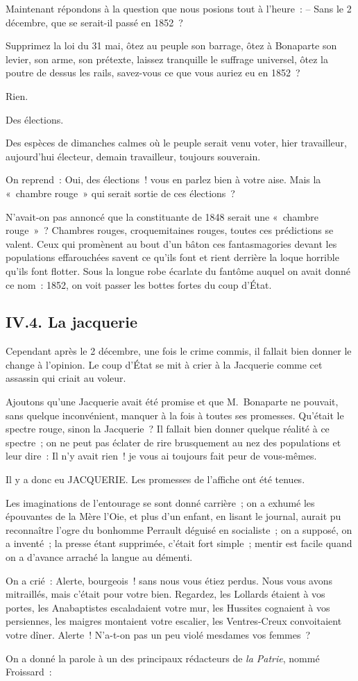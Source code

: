 \documentclass[french,twoside]{book} %
\begin{document}
Maintenant répondons à la question que nous posions tout à l’heure : – Sans le 2 décembre, que se serait-il passé en 1852 ?\par
Supprimez la loi du 31 mai, ôtez au peuple son barrage, ôtez à Bonaparte son levier, son arme, son prétexte, laissez tranquille le suffrage universel, ôtez la poutre de dessus les rails, savez-vous ce que vous auriez eu en 1852 ?\par
Rien.\par
Des élections.\par
Des espèces de dimanches calmes où le peuple serait venu voter, hier travailleur, aujourd’hui électeur, demain travailleur, toujours souverain.\par
On reprend : Oui, des élections ! vous en parlez bien à votre aise. Mais la « chambre rouge » qui serait sortie de ces élections ?\par
N’avait-on pas annoncé que la constituante de 1848 serait une « chambre rouge » ? Chambres rouges, croquemitaines rouges, toutes ces prédictions se valent. Ceux qui promènent au bout d’un bâton ces fantasmagories devant les populations effarouchées savent ce qu’ils font et rient derrière la loque horrible qu’ils font flotter. Sous la longue robe écarlate du fantôme auquel on avait donné ce nom : 1852, on voit passer les bottes fortes du coup d’État.
\subsection[{IV.4. La jacquerie}]{IV.4. La jacquerie}
\noindent Cependant après le 2 décembre, une fois le crime commis, il fallait bien donner le change à l’opinion. Le coup d’État se mit à crier à la Jacquerie comme cet assassin qui criait au voleur.\par
Ajoutons qu’une Jacquerie avait été promise et que M. Bonaparte ne pouvait, sans quelque inconvénient, manquer à la fois à toutes ses promesses. Qu’était le spectre rouge, sinon la Jacquerie ? Il fallait bien donner quelque réalité à ce spectre ; on ne peut pas éclater de rire brusquement au nez des populations et leur dire : Il n’y avait rien ! je vous ai toujours fait peur de vous-mêmes.\par
Il y a donc eu JACQUERIE. Les promesses de l’affiche ont été tenues.\par
Les imaginations de l’entourage se sont donné carrière ; on a exhumé les épouvantes de la Mère l’Oie, et plus d’un enfant, en lisant le journal, aurait pu reconnaître l’ogre du bonhomme Perrault déguisé en socialiste ; on a supposé, on a inventé ; la presse étant supprimée, c’était fort simple ; mentir est facile quand on a d’avance arraché la langue au démenti.\par
On a crié : Alerte, bourgeois ! sans nous vous étiez perdus. Nous vous avons mitraillés, mais c’était pour votre bien. Regardez, les Lollards étaient à vos portes, les Anabaptistes escaladaient votre mur, les Hussites cognaient à vos persiennes, les maigres montaient votre escalier, les Ventres-Creux convoitaient votre dîner. Alerte ! N’a-t-on pas un peu violé mesdames vos femmes ?\par
On a donné la parole à un des principaux rédacteurs de \emph{la Patrie}, nommé Froissard :\par
\end{document}
